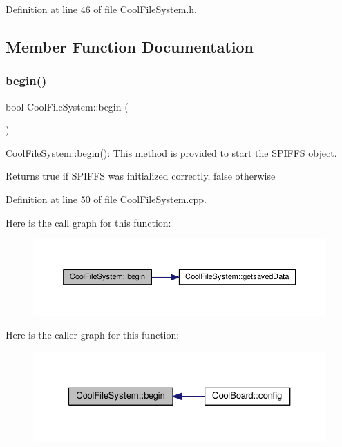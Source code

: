 Definition at line 46 of file Cool\+File\+System.\+h.



\subsection{Member Function Documentation}
\mbox{\label{class_cool_file_system_a6ba6f666ed4c530174f8569d2c636748}} 
\subsubsection{\texorpdfstring{begin()}{begin()}}
{\footnotesize\ttfamily bool Cool\+File\+System\+::begin (\begin{DoxyParamCaption}{ }\end{DoxyParamCaption})}

\hyperlink{class_cool_file_system_a6ba6f666ed4c530174f8569d2c636748}{Cool\+File\+System\+::begin()}\+: This method is provided to start the S\+P\+I\+F\+FS object.

\begin{DoxyReturn}{Returns}
true if S\+P\+I\+F\+FS was initialized correctly, false otherwise 
\end{DoxyReturn}


Definition at line 50 of file Cool\+File\+System.\+cpp.

Here is the call graph for this function\+:\nopagebreak
\begin{figure}[H]
\begin{center}
\leavevmode
\includegraphics[width=350pt]{class_cool_file_system_a6ba6f666ed4c530174f8569d2c636748_cgraph}
\end{center}
\end{figure}
Here is the caller graph for this function\+:\nopagebreak
\begin{figure}[H]
\begin{center}
\leavevmode
\includegraphics[width=327pt]{class_cool_file_system_a6ba6f666ed4c530174f8569d2c636748_icgraph}
\end{center}
\end{figure}
\mbox{\label{class_cool_file_system_a13f2958f5b87757c31fc53797a30d23a}} 
